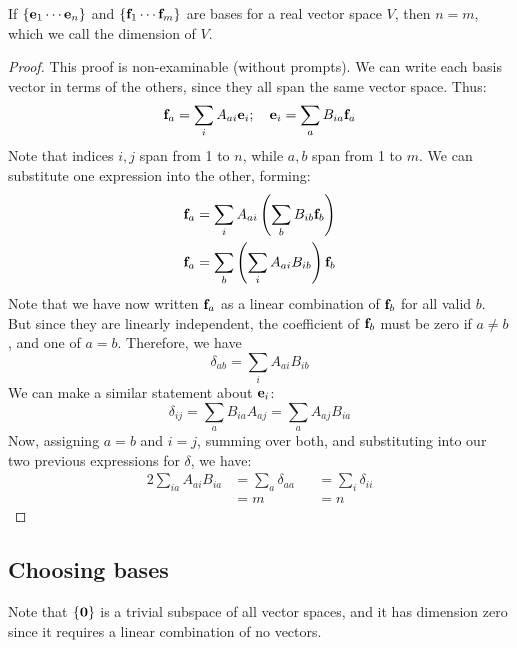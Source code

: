 \begin{theorem}
	If \(\{\vb e_1 \cdots \vb e_n \}\) and \(\{ \vb f_1 \cdots \vb f_m \}\) are bases for a real vector space \(V\), then \(n=m\), which we call the dimension of \(V\).
\end{theorem}
\begin{proof}
	This proof is non-examinable (without prompts).
	We can write each basis vector in terms of the others, since they all span the same vector space.
	Thus:
	\[
		\vb f_a = \sum_i A_{ai} \vb e_i;\quad \vb e_i = \sum_a B_{ia} \vb f_a
	\]
	Note that indices \(i,j\) span from 1 to \(n\), while \(a,b\) span from 1 to \(m\).
	We can substitute one expression into the other, forming:
	\begin{align*}
		\vb f_a & = \sum_i A_{ai} \left( \sum_b B_{ib}\vb f_b \right)  \\
		\vb f_a & = \sum_b \left( \sum_i A_{ai} B_{ib} \right) \vb f_b
	\end{align*}
	Note that we have now written \(\vb f_a\) as a linear combination of \(\vb f_b\) for all valid \(b\).
	But since they are linearly independent, the coefficient of \(\vb f_b\) must be zero if \(a \neq b\), and one of \(a = b\).
	Therefore, we have
	\[
		\delta_{ab} = \sum_i A_{ai} B_{ib}
	\]
	We can make a similar statement about \(\vb e_i\):
	\[
		\delta_{ij} = \sum_a B_{ia} A_{aj} = \sum_a A_{aj} B_{ia}
	\]
	Now, assigning \(a=b\) and \(i=j\), summing over both, and substituting into our two previous expressions for \(\delta\), we have:
	\begin{alignat*}{2}
		\sum_{ia} A_{ai} B_{ia} & = \sum_a \delta_{aa} &  & = \sum_i \delta_{ii} \\
		                        & = m                  &  & = n
	\end{alignat*}
\end{proof}

\subsection{Choosing bases}
Note that \(\{ \vb 0 \}\) is a trivial subspace of all vector spaces, and it has dimension zero since it requires a linear combination of no vectors.

